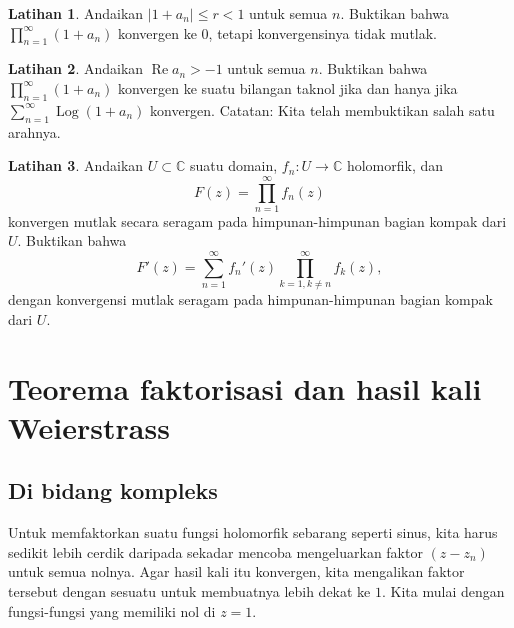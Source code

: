 \documentclass[12pt,openany]{book}
\renewcommand{\Re}{\operatorname{Re}}
\newcommand{\Log}{\operatorname{Log}}
\newcommand{\sabs}[1]{\lvert {#1} \rvert}
\newcommand{\C}{{\mathbb{C}}}
\theoremstyle{plain}
\theoremstyle{remark}
\theoremstyle{definition}
\newenvironment{exbox}{%
    \def\FrameCommand{\vrule width 1pt \relax\hspace{10pt}}%
    \MakeFramed{\advance\hsize-\width\FrameRestore}%
}{%
    \endMakeFramed
}
\theoremstyle{exercise}
\newtheorem{exercise}{Latihan}[section]
\theoremstyle{example}
\begin{document}
\begin{exbox}
\begin{exercise}
Andaikan $\sabs{1+a_n} \leq r < 1$ untuk semua $n$.
Buktikan bahwa $\prod_{n=1}^\infty (1+a_n)$ konvergen ke $0$, tetapi
konvergensinya tidak mutlak.
\end{exercise}

\begin{exercise}
Andaikan $\Re a_n > -1$ untuk semua $n$.  
Buktikan bahwa 
$\prod_{n=1}^\infty (1+a_n)$
konvergen ke suatu bilangan taknol jika dan hanya jika
$\sum_{n=1}^\infty \Log (1+a_n)$ konvergen.  Catatan: Kita telah membuktikan salah satu
arahnya.
\end{exercise}

\begin{exercise}%
\label{exercise:proddiff}
Andaikan $U \subset \C$ suatu domain,
$f_n \colon U \to \C$ holomorfik, dan
\begin{equation*}
F(z) = \prod_{n=1}^\infty f_n(z)
\end{equation*}
konvergen mutlak secara seragam
pada himpunan-himpunan bagian kompak dari $U$.  Buktikan bahwa
\begin{equation*}
F'(z) = \sum_{n=1}^\infty f_n'(z) \prod_{k=1, k \neq n}^\infty f_k(z) ,
\end{equation*}
dengan konvergensi mutlak seragam pada himpunan-himpunan bagian kompak dari $U$.
\end{exercise}
\end{exbox}


\section{Teorema faktorisasi dan hasil kali Weierstrass}
\label{sec:weier}

\subsection{Di bidang kompleks}

Untuk memfaktorkan suatu fungsi holomorfik sebarang seperti sinus,
kita harus sedikit lebih cerdik daripada sekadar mencoba mengeluarkan faktor $(z-z_n)$
untuk semua nolnya.  Agar
hasil kali itu konvergen, kita mengalikan faktor tersebut dengan sesuatu untuk
membuatnya lebih dekat ke $1$.  Kita mulai dengan fungsi-fungsi yang memiliki nol di
$z=1$.
\end{document}
